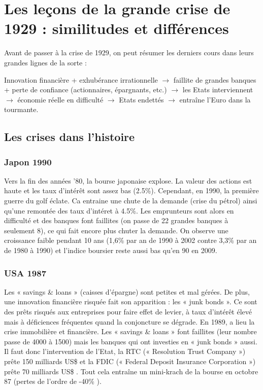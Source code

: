 
\chapter{Les leçons de la grande crise de 1929 :
similitudes et différences}

Avant de passer à la crise de 1929, on peut résumer les derniers cours dans leurs grandes lignes de la sorte : 

\begin{center}
	Innovation financière + exhubérance irrationnelle $\rightarrow$ faillite de grandes banques + perte de confiance (actionnaires, épargnants, etc.) $\rightarrow$ les Etats interviennent $\rightarrow$ économie réelle en difficulté $\rightarrow$ Etats endettés $\rightarrow$ entraîne l'Euro dans la tourmante.
\end{center} 

\section{Les crises dans l'histoire}
\subsection{Japon 1990}
Vers la fin des années '80, la bourse japonaise explose. La valeur des actions est haute et les taux d'intérêt sont assez bas (2.5\%). Cependant, en 1990, la première guerre du golf éclate. Ca entraine une chute de la demande (crise du pétrol) ainsi qu'une remontée des taux d'intéret à 4.5\%. Les emprunteurs sont alors en difficulté et des banques font faillites (on passe de 22 grandes banques à seulement 8), ce qui fait encore plus chuter la demande. On observe une croissance faible pendant 10 ans (1,6\% par an de 1990 à 2002 contre 3,3\% par an de 1980 à 1990) et l'indice boursier reste aussi bas qu'en 90 en 2009.

\subsection{USA 1987}
Les « savings \& loans » (caisses d’épargne) sont petites et mal gérées. De plus, une innovation financière risquée fait son apparition : les « junk bonds ». Ce sont des prêts risqués aux entreprises pour faire effet de levier, à taux d'intérêt élevé mais à déficiences fréquentes quand la conjoncture se dégrade. En 1989, a lieu la crise immobilière et financière. Les « savings \& loans » font faillites (leur nombre passe de 4000 à 1500) mais les banques qui ont investies en « junk bonds » aussi. Il faut donc l'intervention de l’Etat, la RTC (« Resolution Trust Company ») prête 150 milliards US\$ et la FDIC (« Federal Deposit Insurance Corporation ») prête 70 milliards US\$ . Tout cela entraîne un mini-krach de la bourse en octobre 87 (pertes de l'ordre de -40\% ).

